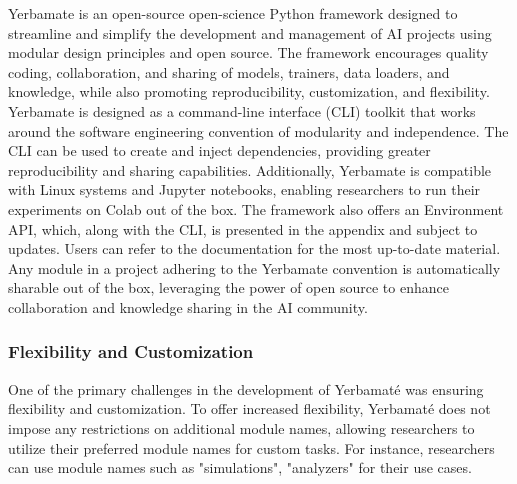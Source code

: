 Yerbamate is an open-source open-science Python framework designed to streamline and simplify the development and management of AI projects using modular design principles and open source. The framework encourages quality coding, collaboration, and sharing of models, trainers, data loaders, and knowledge, while also promoting reproducibility, customization, and flexibility. Yerbamate is designed as a command-line interface (CLI) toolkit that works around the software engineering convention of modularity and independence. The CLI can be used to create and inject dependencies, providing greater reproducibility and sharing capabilities. Additionally, Yerbamate is compatible with Linux systems and Jupyter notebooks, enabling researchers to run their experiments on Colab out of the box. The framework also offers an Environment API, which, along with the CLI, is presented in the appendix and subject to updates. Users can refer to the documentation for the most up-to-date material. Any module in a project adhering to the Yerbamate convention is automatically sharable out of the box, leveraging the power of open source to enhance collaboration and knowledge sharing in the AI community.


\subsubsection{Flexibility and Customization}
One of the primary challenges in the development of Yerbamaté was ensuring flexibility and customization.
To offer increased flexibility, Yerbamaté does not impose any restrictions on additional module names, allowing researchers to utilize their preferred module names for custom tasks. For instance, researchers can use module names such as "simulations", "analyzers" for their use cases.




